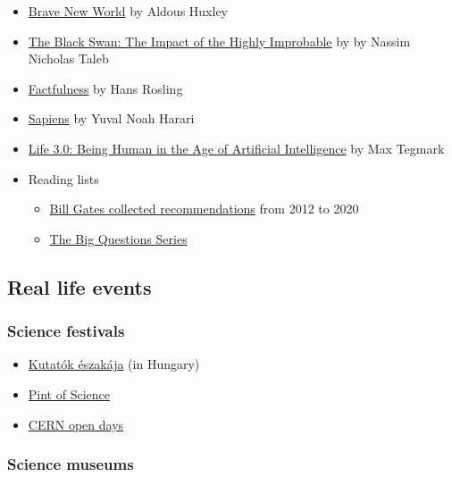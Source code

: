 \documentclass{article}
\begin{document}
\begin{itemize}

    \item \href{https://www.goodreads.com/book/show/5129.Brave_New_World}{Brave New World} by Aldous Huxley
    \item \href{https://www.goodreads.com/book/show/242472.The_Black_Swan}{The Black Swan: The Impact of the Highly Improbable} by by Nassim Nicholas Taleb 
    \item \href{https://www.goodreads.com/book/show/34890015-factfulness}{Factfulness} by Hans Rosling
    \item \href{https://www.goodreads.com/book/show/23692271-sapiens}{Sapiens} by Yuval Noah Harari
    \item \href{https://www.goodreads.com/book/show/34272565-life-3-0}{Life 3.0: Being Human in the Age of Artificial Intelligence} by Max Tegmark
    \item Reading lists
    \begin{itemize}
        \item \href{https://bookriot.com/bill-gates-book-recommendations/}{Bill Gates collected recommendations} from 2012 to 2020
        \item \href{https://www.goodreads.com/series/152497}{The Big Questions Series}
    \end{itemize}
\end{itemize}

\subsection{Real life events}

\subsubsection{Science festivals}

\begin{itemize}
    \item \href{https://kutatokejszakaja.hu/}{Kutatók északája} (in Hungary)
    \item \href{https://pintofscience.com/}{Pint of Science}
    \item \href{https://opendays.cern/}{CERN open days}
\end{itemize}

\subsubsection{Science museums}
\end{document}
